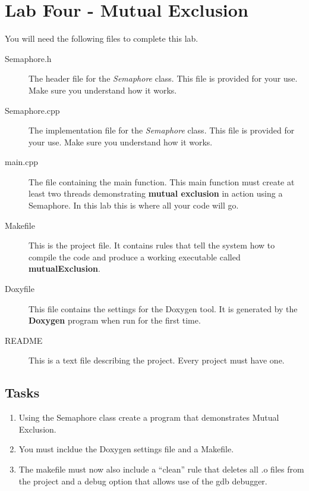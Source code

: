 \documentclass[10pt,a4paper]{article}
\begin{document}
 \section{Lab Four - Mutual Exclusion}
  You will need the following files to complete this lab.
\begin{description}
\item[Semaphore.h] The header file for the \textit{Semaphore} class.  This file is provided for your use.  Make sure you understand how it works.
\item[Semaphore.cpp] The implementation file for the \textit{Semaphore} class.  This file is provided for your use.  Make sure you understand how it works.
\item[main.cpp] The file containing the main function.  This main function must create at least two threads demonstrating \textbf{mutual exclusion} in action using a Semaphore.  In this lab this is where all your code will go.
\item[Makefile] This is the project file. It contains rules that tell the system how to compile the code and produce a working executable called \textbf{mutualExclusion}. 
\item[Doxyfile] This file contains the settings for the Doxygen tool. It is generated by the \textbf{Doxygen} program when run for the first time.
\item[README] This is a text file describing the project. Every project must have one.
\end{description}
 \subsection{Tasks}
\begin{enumerate}
\item Using the Semaphore class create a program that demonstrates Mutual Exclusion.
\item  You must  incldue the Doxygen settings file and a Makefile.
\item The makefile must now also include a “clean” rule that deletes all .o files from the project and a debug option that allows use of the gdb debugger.  
\end{enumerate}
  
\end{document}

